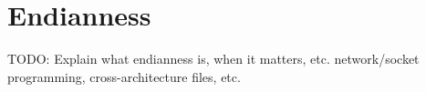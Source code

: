 \chapter{Endianness}

TODO: Explain what endianness is, when it matters, etc.
network/socket programming, cross-architecture files, etc.
